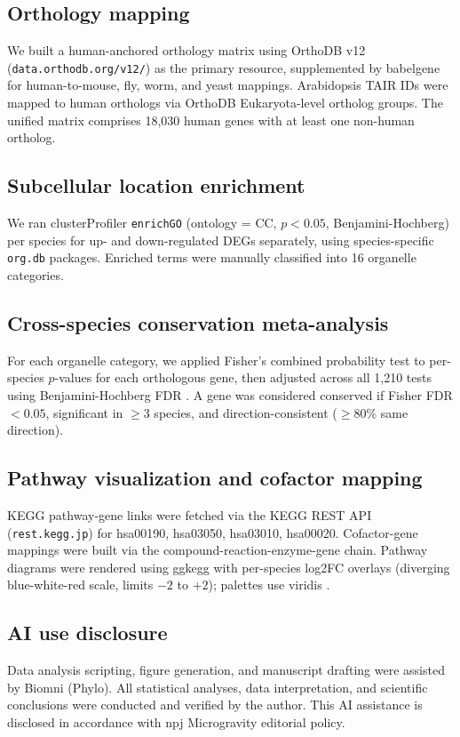 \documentclass[pdflatex,sn-nature]{sn-jnl}
\begin{document}
\subsection{Orthology mapping}
We built a human-anchored orthology matrix using OrthoDB v12 \cite{kuznetsov2023}
(\texttt{data.orthodb.org/v12/}) as the primary resource, supplemented by
babelgene \cite{dolgalev2021} for human-to-mouse, fly, worm, and yeast mappings.
Arabidopsis TAIR IDs were mapped to human orthologs via OrthoDB Eukaryota-level
ortholog groups. The unified matrix comprises 18{,}030 human genes with at least
one non-human ortholog.

\subsection{Subcellular location enrichment}
We ran clusterProfiler \cite{yu2012} \texttt{enrichGO} (ontology = CC, \(p <
0.05\), Benjamini-Hochberg) per species for up- and down-regulated DEGs
separately, using species-specific \texttt{org.db} packages. Enriched terms were
manually classified into 16 organelle categories.

\subsection{Cross-species conservation meta-analysis}
For each organelle category, we applied Fisher's combined probability test
\cite{fisher1925} to per-species \(p\)-values for each orthologous gene, then
adjusted across all 1{,}210 tests using Benjamini-Hochberg FDR
\cite{benjamini1995}. A gene was considered conserved if Fisher FDR \(< 0.05\),
significant in \(\geq 3\) species, and direction-consistent (\(\geq 80\%\) same
direction).

\subsection{Pathway visualization and cofactor mapping}
KEGG \cite{kanehisa2016} pathway-gene links were fetched via the KEGG REST API
(\texttt{rest.kegg.jp}) for hsa00190, hsa03050, hsa03010, hsa00020. Cofactor-gene
mappings were built via the compound-reaction-enzyme-gene chain. Pathway diagrams
were rendered using ggkegg \cite{sato2023} with per-species log2FC overlays
(diverging blue-white-red scale, limits \(-2\) to \(+2\)); palettes use viridis
\cite{garnier2015}.

\subsection{AI use disclosure}
Data analysis scripting, figure generation, and manuscript drafting were assisted
by Biomni (Phylo). All statistical analyses, data interpretation, and scientific
conclusions were conducted and verified by the author. This AI assistance is
disclosed in accordance with npj Microgravity editorial policy.
\end{document}
